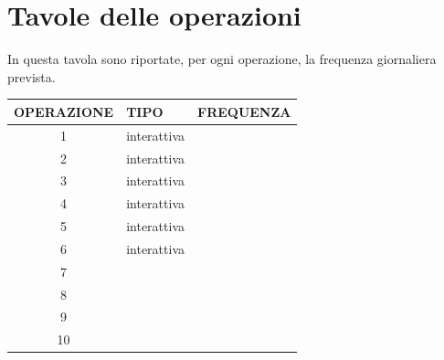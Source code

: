 \documentclass[a4paper, 10pt]{report}
\begin{document}
\section{Tavole delle operazioni}
In questa tavola sono riportate, per ogni operazione, la frequenza giornaliera prevista.
\begin{table}[h!]
\centering
\begin{tabular}{|c|l|l|}
\hline
\textbf{OPERAZIONE}&\textbf{TIPO}&\textbf{FREQUENZA}\\
\hline
1 & interattiva &  \\
\hline
2 & interattiva &  \\
\hline
3 & interattiva &  \\
\hline
4 & interattiva &  \\
\hline
5 & interattiva &  \\
\hline
6 & interattiva & \\
\hline
7 & & \\
\hline
8 & & \\
\hline
9 & & \\
\hline
10 & & \\
\hline
\end{tabular}
\end{table}
\end{document}
